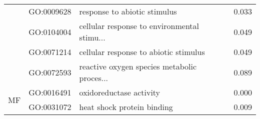 \begin{longtable}{lllr}
   & GO:0009628 &                 response to abiotic stimulus &         0.033 \\
   & GO:0104004 &  cellular response to environmental stimu... &         0.049 \\
   & GO:0071214 &        cellular response to abiotic stimulus &         0.049 \\
   & GO:0072593 &  reactive oxygen species metabolic proces... &         0.089 \\
\cline{1-4}
\multirow{2}{*}{MF} & GO:0016491 &                      oxidoreductase activity &         0.000 \\
   & GO:0031072 &                   heat shock protein binding &         0.009 \\
\end{longtable}
